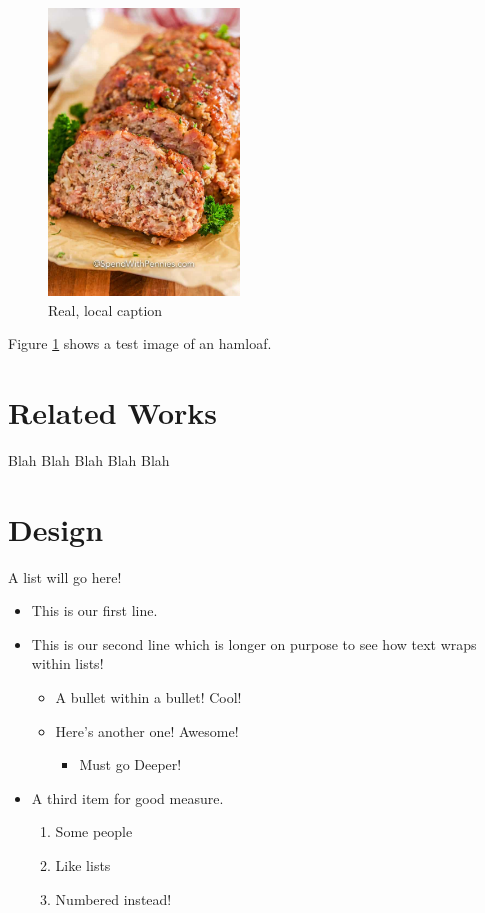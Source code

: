 \documentclass{article}
\begin{document}
    \begin{figure}[H]
        \centering
        \includegraphics[height=3in]{./media/hamloaf.jpeg}
        \caption[Optional caption]{Real, local caption}
        \label{fig:test}
    \end{figure}

    Figure \ref{fig:test} shows a test image of an hamloaf.

    \section{Related Works}\label{sec:relworks}
    Blah Blah Blah Blah Blah

    \section{Design}\label{sec:design}
    A list will go here!

    \begin{itemize}
        \item This is our first line.
        \item This is our second line which is longer on purpose to see how text wraps within lists!
        \begin{itemize}
            \item A bullet within a bullet! Cool!
            \item Here's another one! Awesome!
            \begin{itemize}
                \item Must go Deeper!
            \end{itemize}
        \end{itemize}
        \item A third item for good measure.
        \begin{enumerate}
            \item Some people
            \item Like lists
            \item Numbered instead!
        \end{enumerate}
    \end{itemize}
\end{document}

